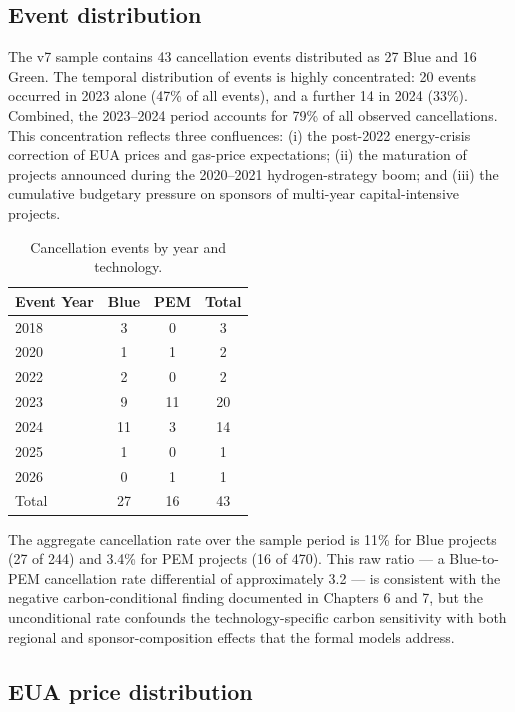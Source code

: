 \subsection{Event distribution}

The v7 sample contains 43 cancellation events distributed as 27 Blue and 16 Green. The temporal distribution of events is highly concentrated: 20 events occurred in 2023 alone (47\% of all events), and a further 14 in 2024 (33\%). Combined, the 2023--2024 period accounts for 79\% of all observed cancellations. This concentration reflects three confluences: (i) the post-2022 energy-crisis correction of EUA prices and gas-price expectations; (ii) the maturation of projects announced during the 2020--2021 hydrogen-strategy boom; and (iii) the cumulative budgetary pressure on sponsors of multi-year capital-intensive projects.

\begin{table}[h!]
\centering
\caption{Cancellation events by year and technology.}
\begin{tabular}{lccc}
\toprule
Event Year & Blue & PEM & Total \\
\midrule
2018 & 3 & 0 & 3 \\
2020 & 1 & 1 & 2 \\
2022 & 2 & 0 & 2 \\
2023 & 9 & 11 & 20 \\
2024 & 11 & 3 & 14 \\
2025 & 1 & 0 & 1 \\
2026 & 0 & 1 & 1 \\
\midrule
Total & 27 & 16 & 43 \\
\bottomrule
\end{tabular}
\label{tab:ch4-events-year}
\end{table}

The aggregate cancellation rate over the sample period is 11\% for Blue projects (27 of 244) and 3.4\% for PEM projects (16 of 470). This raw ratio --- a Blue-to-PEM cancellation rate differential of approximately 3.2 --- is consistent with the negative carbon-conditional finding documented in Chapters 6 and 7, but the unconditional rate confounds the technology-specific carbon sensitivity with both regional and sponsor-composition effects that the formal models address.

\subsection{EUA price distribution}

